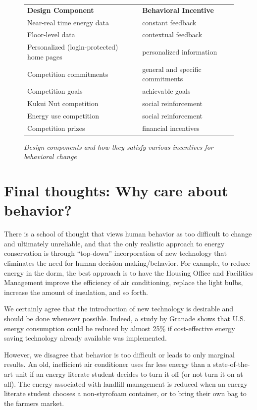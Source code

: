 \documentclass[11pt]{article}
\begin{document}
\begin{figure}[!ht]
\small
\begin{tabular}{p{3in}p{3in}} \hline
{\bf Design Component} & {\bf Behavioral Incentive}  \\
Near-real time energy data & constant feedback \\
Floor-level data & contextual feedback  \\
Personalized (login-protected) home pages  & personalized information \\
Competition commitments & general and specific commitments \\
Competition goals & achievable goals \\
Kukui Nut competition & social reinforcement \\
Energy use competition & social reinforcement \\
Competition prizes & financial incentives  \\ \hline
\end{tabular}
\normalsize
\caption{{\em Design components and how they satisfy various incentives for behavioral change}}
\label{fig:incentives}
\end{figure}

\section{Final thoughts: Why care about behavior?}

There is a school of thought that views human behavior as too difficult to
change and ultimately unreliable, and that the only realistic approach to
energy conservation is through ``top-down'' incorporation of new technology
that eliminates the need for human decision-making/behavior.  For example,
to reduce energy in the dorm, the best approach is to have the Housing
Office and Facilities Management improve the efficiency of air
conditioning, replace the light bulbs, increase the amount of insulation,
and so forth.

We certainly agree that the introduction of new technology is desirable and
should be done whenever possible.  Indeed, a study by Granade \cite{Granade09}
shows that U.S. energy consumption could be reduced by almost 25\% if
cost-effective energy saving technology already available was implemented.

However, we disagree that behavior is too difficult or leads to only
marginal results.  An old, inefficient air conditioner uses far less energy
than a state-of-the-art unit if an energy literate student decides to turn
it off (or not turn it on at all).  The energy associated with landfill
management is reduced when an energy literate student chooses a
non-styrofoam container, or to bring their own bag to the farmers market.
\end{document}
